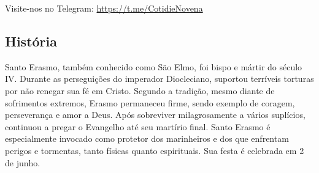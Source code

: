 \documentclass[18pt]{article}
\begin{document}
\newpage

\tableofcontents

\thispagestyle{empty}

\pagestyle{fancy}
\fancyhf{}
\fancyfoot[R]{\thepage}
\centering
\vfill
Visite-nos no Telegram: \url{https://t.me/CotidieNovena}


\newpage

\begin{justify}
\begin{center}
\section{História}\label{sec:História}
\end{center}

Santo Erasmo, também conhecido como São Elmo, foi bispo e mártir do século IV. Durante as perseguições do imperador Diocleciano, suportou terríveis torturas por não renegar sua fé em Cristo. Segundo a tradição, mesmo diante de sofrimentos extremos, Erasmo permaneceu firme, sendo exemplo de coragem, perseverança e amor a Deus. Após sobreviver milagrosamente a vários suplícios, continuou a pregar o Evangelho até seu martírio final. Santo Erasmo é especialmente invocado como protetor dos marinheiros e dos que enfrentam perigos e tormentas, tanto físicas quanto espirituais. Sua festa é celebrada em 2 de junho.

\vfill

\end{justify}
\end{document}
